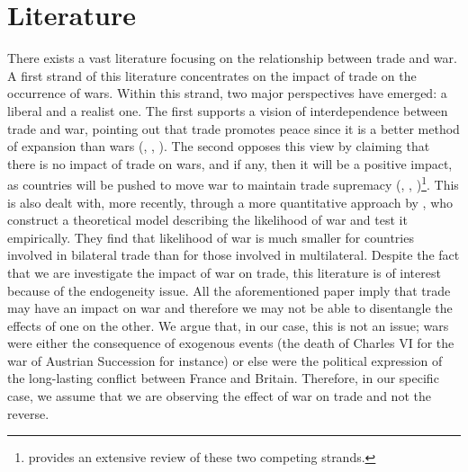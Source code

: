 \documentclass[12pt,a4paper,notitlepage,english]{article}
\begin{document}
\section{Literature} \label{literature}
There exists a vast literature focusing on the relationship between trade and war.
A first strand of this literature concentrates on the impact of trade on the occurrence of wars. Within this strand, two major perspectives have emerged: a liberal and a realist one. The first supports a vision of interdependence between trade and war, pointing out that trade promotes peace since it is a better method of expansion than wars (\cite{doyle1997ways}, \cite{oneal1997classical}, \cite{polachek1980conflict}). The second opposes this view by claiming that there is no impact of trade on wars, and if any, then it will be a positive impact, as countries will be pushed to move war to maintain trade supremacy (\cite{ripsman1996commercial}, \cite{levy1989causes}, \cite{buzan1984economic})\footnote{\cite{mcmillan1997interdependence} provides an extensive review of these two competing strands.}. This is also dealt with, more recently, through a more quantitative approach by \cite{martin2008make}, who construct a theoretical model describing the likelihood of war and test it empirically. They find that likelihood of war is much smaller for countries involved in bilateral trade than for those involved in multilateral. Despite the fact that we are investigate the impact of war on trade, this literature is of interest because of the endogeneity issue. All the aforementioned paper imply that trade may have an impact on war and therefore we may not be able to disentangle the effects of one on the other. We argue that, in our case, this is not an issue; wars were either the consequence of exogenous events (the death of Charles VI for the war of Austrian Succession for instance) or else were the political expression of the long-lasting conflict between France and Britain. Therefore, in our specific case, we assume that we are observing the effect of war on trade and not the reverse. \\
\end{document}

